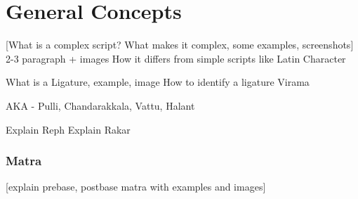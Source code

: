 \chapter{General Concepts} 


[What is a complex script? What makes it complex, some examples, screenshots]
2-3 paragraph + images
How it differs from simple scripts like Latin
Character



What is a Ligature, example, image
How to identify a ligature
Virama

AKA - Pulli, Chandarakkala, Vattu, Halant





	Explain Reph
Explain Rakar
\subsection*{Matra}

[explain prebase, postbase matra with examples and images]






